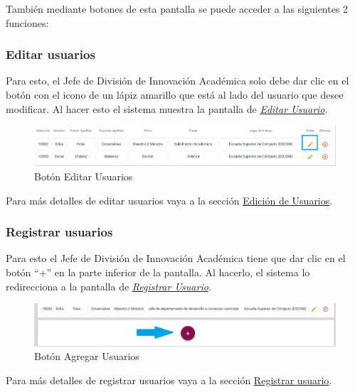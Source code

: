 También mediante botones de esta pantalla se puede acceder a las siguientes 2 funciones:

\subsubsection{Editar usuarios}

Para esto, el Jefe de División de Innovación Académica  solo debe dar clic en el botón con el icono de un lápiz amarillo que está al lado del usuario que desee modificar. Al hacer esto el sistema muestra la pantalla  de \hyperlink{editarUs}{\textit{Editar Usuario}}.

\begin{figure}[H]
	\centering
	\hypertarget{editar}{\includegraphics[width=0.7\linewidth]{images/SP5/BtnEditar}}
	\caption{Botón Editar Usuarios}
	\label{editar}
\end{figure}

Para más detalles de editar usuarios vaya a la sección \hyperlink{editar-user}{Edición de Usuarios}.

\subsubsection{Registrar  usuarios}

Para esto el Jefe de División de Innovación Académica  tiene que dar clic en el botón “+” en la parte inferior de la pantalla. Al hacerlo, el sistema  lo redirecciona a la pantalla de \hyperlink{registrarUs}{\textit{Registrar Usuario}}.

\begin{figure}[H]
	\centering
	\hypertarget{add}{\includegraphics[width=0.7\linewidth]{images/SP5/BtnAgregar}}
	\caption{Botón Agregar Usuarios}
	\label{add}
\end{figure}

Para más detalles de registrar usuarios vaya a la sección \hyperlink{registrar-Us}{Registrar usuario}.

